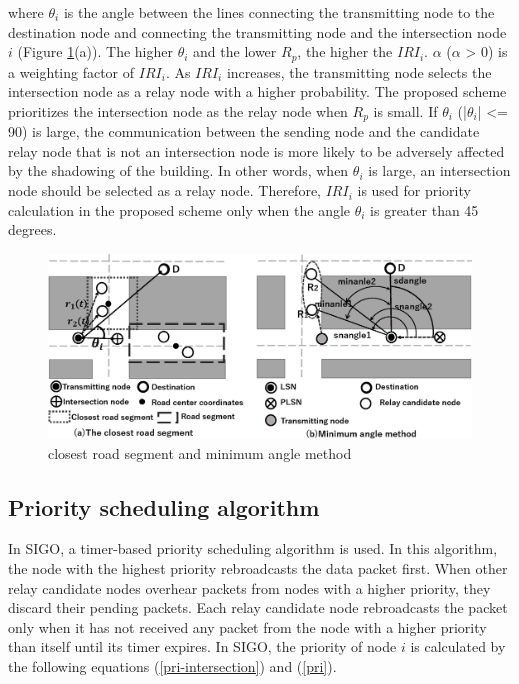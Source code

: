 \documentclass{comex}
\begin{document}
where $\theta_i$ is the angle between the lines connecting the transmitting node to the destination node and  connecting the transmitting node and the intersection node $i$ (Figure \ref{fig:minagnle}(a)).
The higher $\theta_i$  and the lower  $R_p$, the higher the $IRI_i$.
$\alpha$ ($\alpha$ > 0) is a weighting factor of $IRI_i$.
As $IRI_i$ increases, the transmitting node selects the intersection node as a relay node with a higher probability. 
The proposed scheme prioritizes the intersection node as the relay node when $R_p$ is small. 
If $\theta_i$ (|$\theta_i$| <= 90) is large, the communication between the sending node and the candidate relay node that is not an intersection node is more likely to be adversely affected by the shadowing of the building. In other words, when $\theta_i$ is large, an intersection node should be selected as a relay node. Therefore, $IRI_i$ is used for priority calculation in the proposed scheme only when the angle $\theta_i$ is greater than 45 degrees.
 
 

\begin{figure}[!ht]
\centering
\includegraphics[width=120mm]{figures/minangle.eps}
\caption{closest road segment and minimum angle method }
\label{fig:minagnle}
\end{figure}

\subsection{Priority scheduling algorithm}
In SIGO, a timer-based priority scheduling algorithm is used. 
In this algorithm, the node with the highest priority rebroadcasts the data packet first. 
When other relay candidate nodes overhear packets from nodes with a higher priority, they discard their pending packets. Each relay candidate node rebroadcasts the packet only when it has not received any packet from the node with a higher priority than itself until its timer expires.
In SIGO, the priority of node $i$ is calculated by the following equations (\ref{pri-intersection}) and (\ref{pri}).
\end{document}
